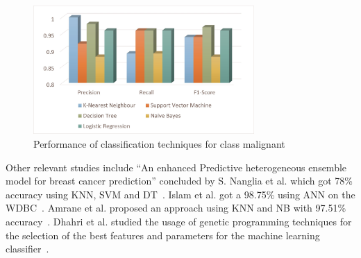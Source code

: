 \begin{figure}[h!]
    \centering
    \includegraphics[width=0.75\textwidth]{figures/Figure3.jpg}
    \caption{Performance of classification techniques for class malignant}
    \label{fig:fig3}
\end{figure}
Other relevant studies include “An enhanced Predictive heterogeneous ensemble model for breast cancer prediction” concluded by S. Nanglia et al. which got 78\% accuracy using KNN, SVM and DT~\cite{carte1}. Islam et al. got a 98.75\% using ANN on the WDBC~\cite{carte3}. Amrane et al. proposed an approach using KNN and NB with 97.51\% accuracy~\cite{carte4}. Dhahri et al. studied the usage of genetic programming techniques for the selection of the best features and parameters for the machine learning classifier~\cite{carte5}.\\